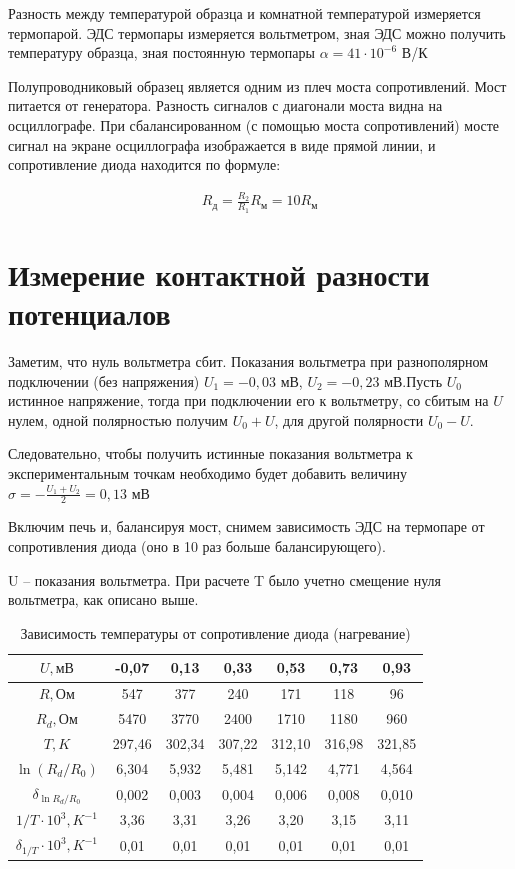 \documentclass[a4paper,12pt]{article}
\begin{document}
Разность между температурой образца и комнатной температурой измеряется термопарой.
ЭДС термопары измеряется вольтметром, зная ЭДС можно получить температуру образца, зная постоянную термопары $\alpha = 41 \cdot 10^{-6}$ В/К

Полупроводниковый образец является одним из плеч моста сопротивлений. Мост питается от  генератора. Разность сигналов с диагонали моста видна на осциллографе. При сбалансированном (с помощью моста сопротивлений) мосте сигнал на экране осциллографа изображается в виде прямой линии, и сопротивление диода находится по формуле:

\begin{align*}
	R_д = \frac{R_2}{R_1} R_м = 10R_м
\end{align*}

\section*{Измерение контактной разности потенциалов}

Заметим, что нуль вольтметра сбит. Показания вольтметра при разнополярном подключении (без напряжения) $U_1 = -0,03$ мВ, $U_2 = -0,23$ мВ.Пусть $U_0$ истинное напряжение, тогда при подключении его к вольтметру, со сбитым на $U$ нулем, одной полярностью получим $U_0 + U$, для другой полярности $U_0 - U$. 

Следовательно, чтобы получить истинные показания вольтметра к экспериментальным точкам необходимо будет добавить величину $\sigma = -\frac{U_1 + U_2}{2} = 0,13$  мВ

Включим печь и, балансируя мост, снимем зависимость ЭДС на термопаре от сопротивления диода (оно в 10 раз больше балансирующего).

U -- показания вольтметра. При расчете T было учетно смещение нуля вольтметра, как описано выше.

\newpage

\begin{table}[h]
\centering
\caption{Зависимость температуры от сопротивление диода (нагревание)}
\begin{tabular}{|c|c|c|c|c|c|c|}
\hline
$U, мВ$ & -0,07 & 0,13 & 0,33 & 0,53 & 0,73 & 0,93 \\ \hline
$R, Ом$ & 547 & 377 & 240 & 171 & 118 & 96 \\ \hline
$R_d, Ом$ & 5470 & 3770 & 2400 & 1710 & 1180 & 960 \\ \hline
$T, K$ & 297,46 & 302,34 & 307,22 & 312,10 & 316,98 & 321,85 \\ \hline
$\ln(R_d/R_0)$ & 6,304 & 5,932 & 5,481 & 5,142 & 4,771 & 4,564 \\ \hline
$\delta_{\ln R_d/R_0}$ & 0,002 & 0,003 & 0,004 & 0,006 & 0,008 & 0,010 \\ \hline
$1/T \cdot 10^3, K^{-1}$ & 3,36 & 3,31 & 3,26 & 3,20 & 3,15 & 3,11 \\ \hline
$\delta_{1/T} \cdot 10^3, K^{-1}$ & 0,01 & 0,01 & 0,01 & 0,01 & 0,01 & 0,01 \\ \hline
\end{tabular}
\end{table}
\end{document}
